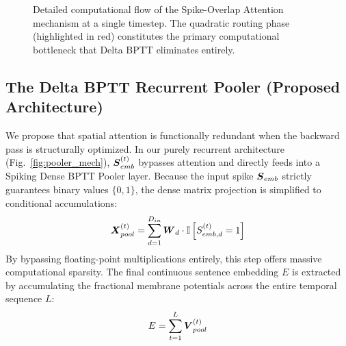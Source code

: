 \documentclass[11pt, conference, compsoc, twoside]{IEEEtran}
\begin{document}
\begin{figure}[t!]
\begin{center}
{%
}
\caption{Detailed computational flow of the Spike-Overlap Attention mechanism at a single timestep. The quadratic routing phase (highlighted in red) constitutes the primary computational bottleneck that Delta BPTT eliminates entirely.}
\label{fig:attention_mech}
\end{center}
\end{figure}


\subsection{The Delta BPTT Recurrent Pooler (Proposed Architecture)}
We propose that spatial attention is functionally redundant when the backward pass is structurally optimized. In our purely recurrent architecture (Fig.~\ref{fig:pooler_mech}), $\boldsymbol{S}_{emb}^{(t)}$ bypasses attention and directly feeds into a Spiking Dense BPTT Pooler layer. Because the input spike $\boldsymbol{S}_{emb}$ strictly guarantees binary values $\{0, 1\}$, the dense matrix projection is simplified to conditional accumulations:
\begin{equation}
\boldsymbol{X}_{pool}^{(t)} = \sum_{d=1}^{D_{in}} \boldsymbol{W}_{d} \cdot \mathbb{I}\left[ S_{emb, d}^{(t)} = 1 \right]
\end{equation}
By bypassing floating-point multiplications entirely, this step offers massive computational sparsity. The final continuous sentence embedding $E$ is extracted by accumulating the fractional membrane potentials across the entire temporal sequence $L$:
\begin{equation}
E = \sum_{t=1}^L \boldsymbol{V}_{pool}^{(t)}
\end{equation}
\end{document}
